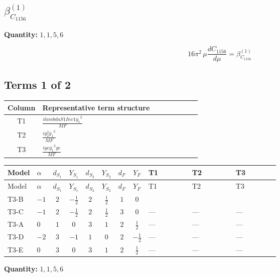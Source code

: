 \documentclass[8pt]{article}
\begin{document}
\begin{landscape}
\section*{$\beta_{C_{1156}}^{(1)}$}
\noindent\textbf{Quantity: }$\mathrm{1,1,5,6}$\par\smallskip
\[16\pi^2\,\mu\frac{d C_{1156}}{d\mu}=\beta_{C_{1156}}^{(1)}\]
\subsection*{Terms 1 of 2}
\begin{center}
\begin{tabular}{@{}c >{\raggedright\arraybackslash}p{0.82\linewidth}@{}}
\toprule
Column & Representative term structure \\
\midrule
T1 & \(\displaystyle \frac{i lambdaS1Inv1 \overline{y_{1}}^{2}}{MF}\) \\
\midrule
T2 & \(\displaystyle \frac{i g_{2}^{2} \overline{y_{1}}^{2}}{MF}\) \\
\midrule
T3 & \(\displaystyle \frac{i ye \overline{y_{1}}^{2} \overline{ye}}{MF}\) \\
\midrule
\bottomrule
\end{tabular}
\end{center}
\smallskip
\tiny
\begin{longtable}{@{}llcccccc >{\raggedright\arraybackslash}p{0.21\linewidth} >{\raggedright\arraybackslash}p{0.21\linewidth} >{\raggedright\arraybackslash}p{0.21\linewidth}@{}}
\toprule
Model & $\alpha$ & $d_{S_1}$ & $Y_{S_1}$ & $d_{S_2}$ & $Y_{S_2}$ & $d_F$ & $Y_F$ & T1 & T2 & T3 \\
\midrule
\endfirsthead
\toprule
Model & $\alpha$ & $d_{S_1}$ & $Y_{S_1}$ & $d_{S_2}$ & $Y_{S_2}$ & $d_F$ & $Y_F$ & T1 & T2 & T3 \\
\midrule
\endhead
T3-B & $-1$ & $2$ & $-\frac{1}{2}$ & $2$ & $\frac{1}{2}$ & $1$ & $0$ & \scriptsize\adjustbox{max width=\linewidth}{$\begin{gathered} \frac{i lambdaS1Inv1 \overline{y_{1}}^{2}}{2 MF}\end{gathered}$} & \scriptsize\adjustbox{max width=\linewidth}{$\begin{gathered} \frac{3 i g_{2}^{2} \overline{y_{1}}^{2}}{4 MF}\end{gathered}$} & \scriptsize\adjustbox{max width=\linewidth}{$\begin{gathered} - \frac{i ye \overline{y_{1}}^{2} \overline{ye}}{4 MF}\end{gathered}$} \\
\midrule
T3-C & $-1$ & $2$ & $-\frac{1}{2}$ & $2$ & $\frac{1}{2}$ & $3$ & $0$ & --- & --- & --- \\
\midrule
T3-A & $0$ & $1$ & $0$ & $3$ & $1$ & $2$ & $\frac{1}{2}$ & --- & --- & --- \\
\midrule
T3-D & $-2$ & $3$ & $-1$ & $1$ & $0$ & $2$ & $-\frac{1}{2}$ & --- & --- & --- \\
\midrule
T3-E & $0$ & $3$ & $0$ & $3$ & $1$ & $2$ & $\frac{1}{2}$ & --- & --- & --- \\
\midrule
\bottomrule
\end{longtable}
\clearpage
\noindent\textbf{Quantity: }$\mathrm{1,1,5,6}$\par\smallskip

\end{landscape}
\end{document}
